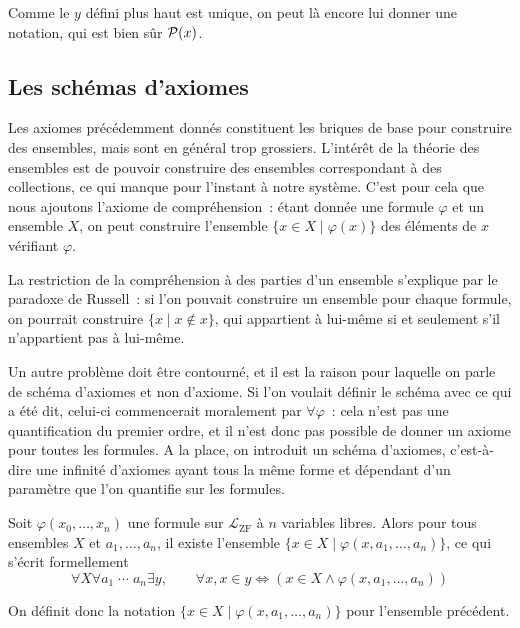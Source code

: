 \begin{notation}
  Comme le $y$ défini plus haut est unique, on peut là encore lui donner une
  notation, qui est bien sûr $\mathcal{P}(x)$.
\end{notation}

\subsection{Les schémas d'axiomes}

Les axiomes précédemment donnés constituent les briques de base pour construire
des ensembles, mais sont en général trop grossiers. L'intérêt de la théorie des
ensembles est de pouvoir construire des ensembles correspondant à des
collections, ce qui manque pour l'instant à notre système. C'est pour cela que
nous ajoutons l'axiome de compréhension~: étant donnée une formule $\varphi$ et
un ensemble $X$, on peut construire l'ensemble $\{x \in X\mid \varphi(x)\}$ des
éléments de $x$ vérifiant $\varphi$.

La restriction de la compréhension à des parties d'un ensemble s'explique par le
paradoxe de Russell~: si l'on pouvait construire un ensemble pour chaque
formule, on pourrait construire $\{ x \mid x\notin x\}$, qui appartient à
lui-même si et seulement s'il n'appartient pas à lui-même.

Un autre problème doit être contourné, et il est la raison pour laquelle on
parle de schéma d'axiomes et non d'axiome. Si l'on voulait définir le schéma
avec ce qui a été dit, celui-ci commencerait moralement par $\forall \varphi$~:
cela n'est pas une quantification du premier ordre, et il n'est donc pas
possible de donner un axiome pour toutes les formules. A la place, on introduit
un schéma d'axiomes, c'est-à-dire une infinité d'axiomes ayant tous la même
forme et dépendant d'un paramètre que l'on quantifie sur les formules.

\begin{axiom}\label{ax.ZF.compre}
  Soit $\varphi(x_0,\ldots,x_n)$ une formule sur $\mathcal L_{\mathrm{ZF}}$
  à $n$ variables libres. Alors pour tous ensembles $X$ et $a_1,\ldots,a_n$, il
  existe l'ensemble $\{x\in X \mid \varphi(x,a_1,\ldots,a_n)\}$, ce qui s'écrit
  formellement
  \[\forall X\forall a_1\;\cdots\;a_n\exists y,\qquad
    \forall x, x \in y \iff (x\in X\land \varphi(x,a_1,\ldots,a_n))\]
\end{axiom}

\begin{notation}
  On définit donc la notation $\{x\in X\mid \varphi(x,a_1,\ldots,a_n)\}$ pour
  l'ensemble précédent.
\end{notation}

